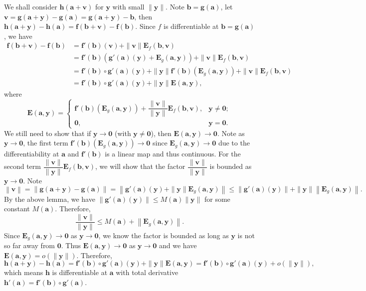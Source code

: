     \begin{proofenv}
        We shall consider $\bm h (\bm a + \bm v)$ for $\bm y $ with small $\| \bm y \|$. Note $\bm b = \bm g(\bm a)$, let $\bm v = \bm g(\bm a + \bm y) - \bm g(\bm a) = \bm g(\bm a + \bm y) - \bm b$, then $\bm h (\bm a + \bm y) - \bm h(\bm a) = \bm f(\bm b + \bm v) - \bm f(\bm b)$. 
        Since $f$ is differentiable at $\bm b=\bm g(\bm a)$, we have
        $$ \begin{aligned}
            \bm f(\bm b + \bm v) - \bm f(\bm b) &= \bm f'(\bm b)(\bm v) + \|\bm v\| \bm E_f(\bm b, \bm v)\\
            &= \bm f'(\bm b)(\bm g'(\bm a)(\bm y) + \bm E_g(\bm a, \bm y)) + \|\bm v\| \bm E_f(\bm b, \bm v)\\ 
            &= \bm f'(\bm b) \circ \bm g'(\bm a)(\bm y) + \|\bm y\| \bm f'(\bm b)(\bm E_g(\bm a, \bm y)) + \|\bm v\| \bm E_f(\bm b, \bm v)\\
            &= \bm f'(\bm b) \circ \bm g'(\bm a)(\bm y) + \|\bm y\| \bm E(\bm a, \bm y),
        \end{aligned}$$
        where $$\bm E(\bm a, \bm y) = \begin{cases}
            \bm f'(\bm b)(\bm E_g(\bm a, \bm y)) + \dfrac{\|\bm v\|}{\|\bm y\|} \bm E_f(\bm b, \bm v), & \bm y \ne \bm 0; \\[6pt]
            \bm 0, & \bm y = \bm 0.
        \end{cases}$$
        We still need to show that if $\bm y \to \bm 0$ (with $\bm y \ne \bm 0$), then $\bm E(\bm a, \bm y) \to \bm 0$. Note as $\bm y \to \bm 0$, the first term $\bm f'(\bm b)(\bm E_g(\bm a, \bm y)) \to \bm 0$ since $\bm E_g(\bm a, \bm y) \to \bm 0$ due to the differentiability at $\bm a$ and $\bm f'(\bm b)$ is a linear map and thus continuous. For the second term $\dfrac{\|\bm v\|}{\|\bm y\|} \bm E_f(\bm b, \bm v)$, we will show that the factor $\dfrac{\|\bm v\|}{\|\bm y\|}$ is bounded as $\bm y \to \bm 0$. Note
        $$ \left\|\bm v\right\| = \left\|\bm g(\bm a + \bm y) - \bm g(\bm a)\right\| = \left\|\bm g'(\bm a)(\bm y) + \|\bm y\| \bm E_g(\bm a, \bm y)\right\| \le \left\|\bm g'(\bm a)(\bm y)\right\| + \|\bm y\| \left\|\bm E_g(\bm a, \bm y)\right\|. $$
        By the above lemma, we have $\left\|\bm g'(\bm a)(\bm y)\right\| \le M(\bm a) \|\bm y\|$ for some constant $M(\bm a)$. Therefore,
        $$ \frac{\|\bm v\|}{\|\bm y\|} \le M(\bm a) + \left\|\bm E_g(\bm a, \bm y)\right\|. $$
        Since $\bm E_g(\bm a, \bm y) \to \bm 0$ as $\bm y \to \bm 0$, we know the factor is bounded as long as $\bm y$ is not so far away from $\bm 0$. Thus $\bm E(\bm a, \bm y) \to \bm 0$ as $\bm y \to \bm 0$ and we have $\bm E(\bm a, \bm y) = o(\|\bm y\|)$. Therefore,
        $$ \bm h(\bm a + \bm y) - \bm h(\bm a) = \bm f'(\bm b) \circ \bm g'(\bm a)(\bm y) + \| \bm y \| \bm E(\bm a, \bm y) = \bm f'(\bm b) \circ \bm g'(\bm a)(\bm y) + o(\|\bm y\|), $$
        which means $\bm h$ is differentiable at $\bm a$ with total derivative $\bm h'(\bm a) = \bm f'(\bm b) \circ \bm g'(\bm a)$.
    \end{proofenv}
